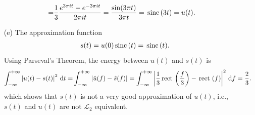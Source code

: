 \documentclass{assignment}
\begin{document}
\begin{sol}
\begin{itemize}
\begin{align}
            \notag=&\frac{1}{3}\frac{e^{3\pi it}-e^{-3\pi it}}{2\pi it}=\frac{\sin(3\pi t)}{3\pi t}=\,\text{sinc}\,(3t)=u(t).
        \end{align}
        \item[(e)] The approximation function
        \begin{align}
            s(t)=u(0)\,\text{sinc}\,(t)=\,\text{sinc}\,(t).
        \end{align}
        Using Parseval's Theorem, the energy between $u(t)$ and $s(t)$ is
        \begin{align}
            \notag\int_{-\infty}^{+\infty}\left\lvert u(t)-s(t)\right\rvert^2\,\mathrm{d}t=&\int_{-\infty}^{+\infty}\left\lvert\hat{u}(f)-\hat{s}(f)\right\rvert=\int_{-\infty}^{+\infty}\left\lvert\frac{1}{3}\,\text{rect}\,\left(\frac{f}{3}\right)-\,\text{rect}\,\left(f\right)\right\rvert^2\,\mathrm{d}f=\frac{2}{3}.
        \end{align}
        which shows that $s(t)$ is not a very good approximation of $u(t)$, i.e., $s(t)$ and $u(t)$ are not $\mathcal{L}_2$ equivalent.
    \end{itemize}
\end{sol}
\end{document}
